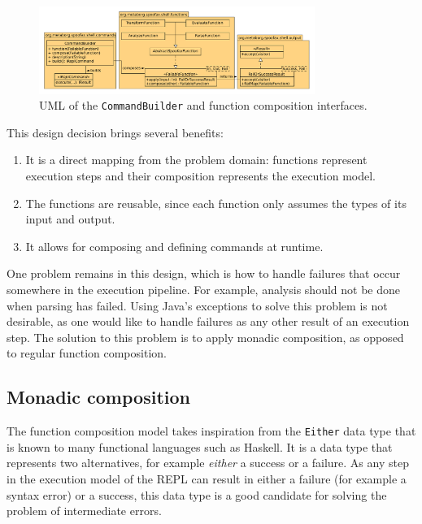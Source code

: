 \begin{figure}[b]
  \centering
  \includegraphics[width=0.8\textwidth]{uml-function-comp}
  \caption{UML of the \texttt{CommandBuilder} and function composition
    interfaces.}
  \label{fig:uml-function-comp}
\end{figure}

This design decision brings several benefits:

\begin{enumerate}
\item It is a direct mapping from the problem domain: functions
  represent execution steps and their composition represents the
  execution model.
\item The functions are reusable, since each function only assumes
  the types of its input and output.
\item It allows for composing and defining commands at runtime.
\end{enumerate}

One problem remains in this design, which is how to handle failures that occur
somewhere in the execution pipeline. For example, analysis should not be
done when parsing has failed. Using Java's exceptions to solve this problem
is not desirable, as one would like to handle failures as any other result of an
execution step. The solution to this problem is to apply monadic composition, as
opposed to regular function composition.

\subsection{Monadic composition}
\label{sec:monadic-composition}
The function composition model takes inspiration from the \texttt{Either}
data type that is known to many functional languages such as
Haskell. It is a data type that represents two alternatives, for
example \textit{either} a success or a failure. As any step in the
execution model of the REPL can result in either a failure (for
example a syntax error) or a success, this data type is a good
candidate for solving the problem of intermediate errors.

